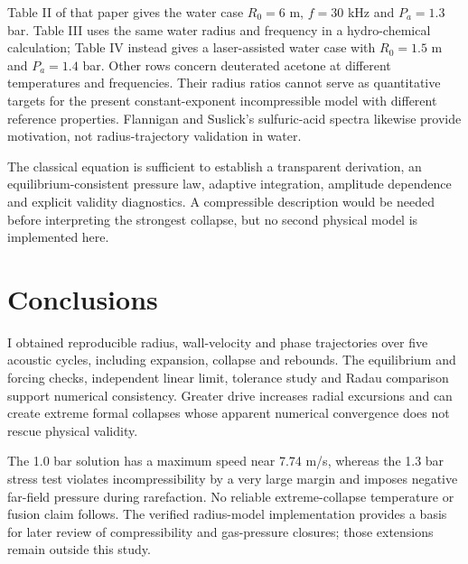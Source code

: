 \documentclass[10pt,a4paper]{article}
\newcommand{\Pa}{P_a}
\begin{document}
Table II of that paper gives the water case $R_0=6$ \textmu m, $f=30$ kHz and $\Pa=1.3$ bar. Table III uses the same water radius and frequency in a hydro-chemical calculation; Table IV instead gives a laser-assisted water case with $R_0=1.5$ \textmu m and $\Pa=1.4$ bar. Other rows concern deuterated acetone at different temperatures and frequencies. Their radius ratios cannot serve as quantitative targets for the present constant-exponent incompressible model with different reference properties. Flannigan and Suslick's sulfuric-acid spectra likewise provide motivation, not radius-trajectory validation in water.

The classical equation is sufficient to establish a transparent derivation, an equilibrium-consistent pressure law, adaptive integration, amplitude dependence and explicit validity diagnostics. A compressible description would be needed before interpreting the strongest collapse, but no second physical model is implemented here.

\section{Conclusions}
I obtained reproducible radius, wall-velocity and phase trajectories over five acoustic cycles, including expansion, collapse and rebounds. The equilibrium and forcing checks, independent linear limit, tolerance study and Radau comparison support numerical consistency. Greater drive increases radial excursions and can create extreme formal collapses whose apparent numerical convergence does not rescue physical validity.

The 1.0 bar solution has a maximum speed near 7.74 m/s, whereas the 1.3 bar stress test violates incompressibility by a very large margin and imposes negative far-field pressure during rarefaction. No reliable extreme-collapse temperature or fusion claim follows. The verified radius-model implementation provides a basis for later review of compressibility and gas-pressure closures; those extensions remain outside this study.
\end{document}
